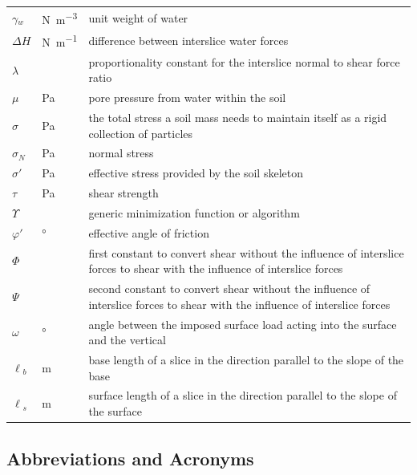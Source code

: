 \documentclass[12pt]{article}
\renewcommand{\arraystretch}{1}
\begin{document}
\begin{longtable*}{  l  l  p{8.5cm}  }
\\
${\gamma{}_{w}}$ & \si{\newton\per\cubic\meter} & unit weight of water
\\
$\Delta{}H$ & \si{\newton\per\meter} & difference between interslice water 
forces
\\
$\lambda{}$ & & proportionality constant for the interslice normal to shear 
force ratio
\\
$\mu{}$ &\si{\pascal} & pore pressure from water within the soil
\\
$\sigma{}$ & \si{\pascal} & the total stress a soil mass needs
to maintain itself as a rigid collection of particles
\\
$\sigma{}_N$ & \si{\pascal} & normal stress
\\
$\sigma{}'$ & \si{\pascal} & effective stress provided by the soil skeleton
\\
$\tau{}$ & \si{\pascal} & shear strength
\\
$\Upsilon{}$ & & generic minimization function or algorithm 
\\
$\varphi{}'$ & \si{\degree} & effective angle of friction
\\
$\Phi{}$ & & first constant to convert shear without the 
influence of interslice forces to shear with the influence of 
interslice forces
\\
$\Psi{}$ & & second constant to convert shear without the 
influence of interslice forces to shear with the influence of interslice 
forces
\\
$\omega{}$ & \si{\degree} & angle between the imposed surface load acting into 
the surface and the vertical
\\
${\ell{}_{b}}$ &  \si{\meter}& base length of a slice in the 
direction parallel to the slope of the base
\\
${\ell{}_{s}}$ &  \si{\meter}& surface length of a slice in the direction 
parallel to the slope of the surface \\

\hline
\end{longtable*}
\renewcommand{\arraystretch}{1}


\subsection{Abbreviations and Acronyms}
\end{document}
